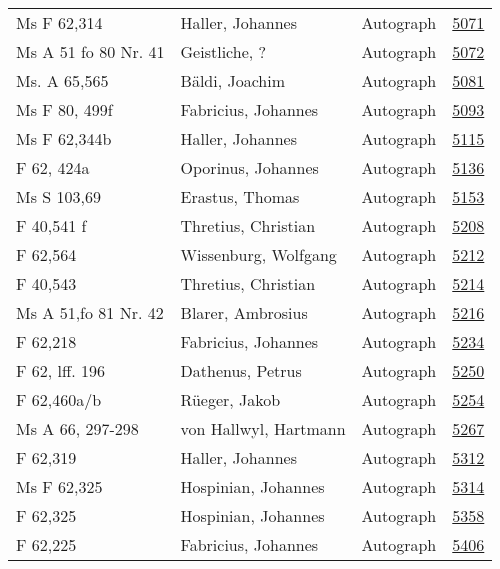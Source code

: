 \documentclass[10pt,a4paper,landscape]{report}
\begin{document}
\begin{longtable}{p{16cm}p{4cm}lr}
Ms F 62,314	&	Haller, Johannes	&	Autograph	&	\href{http://130.60.24.72/assignment/5071}{5071}\\
Ms A 51 fo 80 Nr. 41	&	Geistliche, ?	&	Autograph	&	\href{http://130.60.24.72/assignment/5072}{5072}\\
Ms. A 65,565	&	Bäldi, Joachim	&	Autograph	&	\href{http://130.60.24.72/assignment/5081}{5081}\\
Ms F 80, 499f	&	Fabricius, Johannes	&	Autograph	&	\href{http://130.60.24.72/assignment/5093}{5093}\\
Ms F 62,344b	&	Haller, Johannes	&	Autograph	&	\href{http://130.60.24.72/assignment/5115}{5115}\\
F 62, 424a	&	Oporinus, Johannes	&	Autograph	&	\href{http://130.60.24.72/assignment/5136}{5136}\\
Ms S 103,69	&	Erastus, Thomas	&	Autograph	&	\href{http://130.60.24.72/assignment/5153}{5153}\\
F 40,541 f	&	Thretius, Christian	&	Autograph	&	\href{http://130.60.24.72/assignment/5208}{5208}\\
F 62,564	&	Wissenburg, Wolfgang	&	Autograph	&	\href{http://130.60.24.72/assignment/5212}{5212}\\
F 40,543	&	Thretius, Christian	&	Autograph	&	\href{http://130.60.24.72/assignment/5214}{5214}\\
Ms A 51,fo 81 Nr. 42	&	Blarer, Ambrosius	&	Autograph	&	\href{http://130.60.24.72/assignment/5216}{5216}\\
F 62,218	&	Fabricius, Johannes	&	Autograph	&	\href{http://130.60.24.72/assignment/5234}{5234}\\
F 62, lff. 196	&	Dathenus, Petrus	&	Autograph	&	\href{http://130.60.24.72/assignment/5250}{5250}\\
F 62,460a/b	&	Rüeger, Jakob	&	Autograph	&	\href{http://130.60.24.72/assignment/5254}{5254}\\
Ms A 66, 297-298	&	von Hallwyl, Hartmann	&	Autograph	&	\href{http://130.60.24.72/assignment/5267}{5267}\\
F 62,319	&	Haller, Johannes	&	Autograph	&	\href{http://130.60.24.72/assignment/5312}{5312}\\
Ms F 62,325	&	Hospinian, Johannes	&	Autograph	&	\href{http://130.60.24.72/assignment/5314}{5314}\\
F 62,325	&	Hospinian, Johannes	&	Autograph	&	\href{http://130.60.24.72/assignment/5358}{5358}\\
F 62,225	&	Fabricius, Johannes	&	Autograph	&	\href{http://130.60.24.72/assignment/5406}{5406}\\

\end{longtable}
\end{document}
